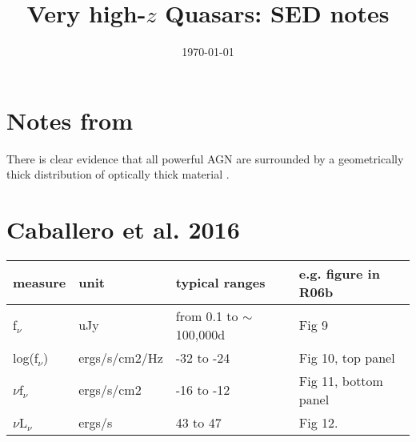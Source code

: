 \documentclass[11pt,a4paper]{article}
\begin{document}
   \title{Very high-$z$ Quasars: SED notes}
 \date{\today}
\maketitle

\section{Notes from \citet{Roseboom2013}}
There is clear evidence that all powerful AGN are surrounded by a
geometrically thick distribution of optically thick material 
\citep{Rowan-Robinson 1977, Lawrence_Elvis1982, Antonucci_Miller1985, 
Edelson1987, Elvis1994, Richards2006b}. 

\section{Caballero et al. 2016}
\citet{Caballero2016}



\begin{tabular}{ l l l l }
\hline \hline
measure	   &	unit	&	typical ranges		&	e.g. figure in R06b  \\
\hline
f$_{\nu}$		    &    uJy		  & from 0.1 to $\sim$100,000d &     Fig 9 \\
log(f$_{\nu}$)	    & ergs/s/cm2/Hz  &	-32 to -24  	     	&	Fig 10, top panel \\
$\nu$f$_{\nu}$     &	ergs/s/cm2        & 	-16 to -12		&	Fig 11, bottom panel  \\
$\nu$L$_{\nu}$     &  ergs/s	           &  43 to  47		&	Fig 12. \\
\hline \hline
\end{tabular}





\end{document}
